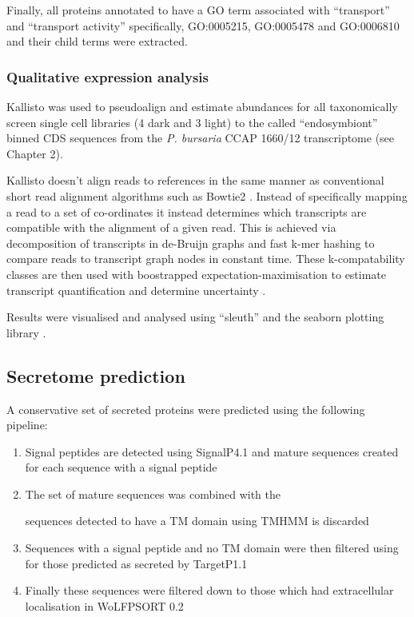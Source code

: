 Finally, all proteins annotated to have a GO term associated with ``transport'' and
``transport activity'' specifically, GO:0005215, GO:0005478 and GO:0006810 and their child
terms were extracted.  

\subsubsection{Qualitative expression analysis}

Kallisto \citep{Bray2015} was used to pseudoalign and estimate abundances for 
all taxonomically screen single cell 
libraries (4 dark and 3 light) to the called ``endosymbiont''
binned CDS sequences from the \textit{P. bursaria} CCAP 1660/12
transcriptome (see Chapter 2).

Kallisto doesn't align reads to references in the same
manner as conventional short read alignment algorithms
such as Bowtie2 \citep{Langmead2012}.  Instead of specifically 
mapping a read to a set of co-ordinates it instead
determines which transcripts are compatible with the alignment 
of a given read.  This is achieved via decomposition of transcripts
in de-Bruijn graphs and fast k-mer hashing to compare reads to transcript
graph nodes in constant time.  These k-compatability classes are then used with
boostrapped expectation-maximisation to estimate transcript quantification and
determine uncertainty \citep{Bray2015}. 

Results were visualised and analysed using ``sleuth'' and the
seaborn plotting library \citep{michael_waskom_2015_19108}.

\subsection{Secretome prediction}

A conservative set of secreted proteins were predicted 
using the following pipeline:
\begin{enumerate}
    \item Signal peptides are detected using SignalP4.1 and mature sequences
        created for each sequence with a signal peptide
    \item The set of mature sequences was combined with the 
        
        
        sequences detected to have a TM domain using TMHMM is discarded
    \item Sequences with a signal peptide and no TM domain were then filtered
        using for those predicted as secreted by TargetP1.1 
    \item Finally these sequences were filtered down to those which had extracellular
        localisation in WoLFPSORT 0.2 
\end{enumerate}


